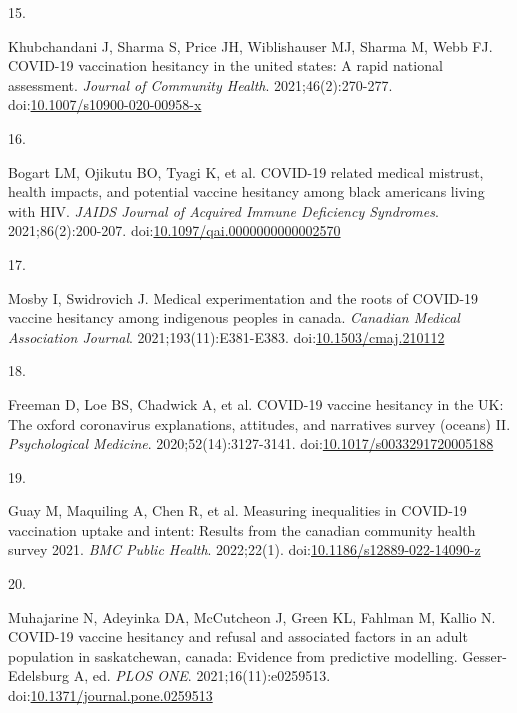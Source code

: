 \documentclass[
  letterpaper,
  DIV=11,
  numbers=noendperiod]{scrartcl}
\newlength{\cslhangindent}
\newlength{\csllabelwidth}
\newlength{\cslentryspacingunit} %
\newenvironment{CSLReferences}[2] %
 {%
  \setlength{\parindent}{0pt}
  \ifodd #1
  \let\oldpar\par
  \def\par{\hangindent=\cslhangindent\oldpar}
  \fi
  \setlength{\parskip}{#2\cslentryspacingunit}
 }%
 {}
\newcommand{\CSLLeftMargin}[1]{\parbox[t]{\csllabelwidth}{#1}}
\newcommand{\CSLRightInline}[1]{\parbox[t]{\linewidth - \csllabelwidth}{#1}\break}
\begin{document}
\begin{CSLReferences}{0}{0}
\leavevmode{}%
\CSLLeftMargin{15. }%
\CSLRightInline{Khubchandani J, Sharma S, Price JH, Wiblishauser MJ,
Sharma M, Webb FJ. {COVID}-19 vaccination hesitancy in the united
states: A rapid national assessment. \emph{Journal of Community Health}.
2021;46(2):270-277.
doi:\href{https://doi.org/10.1007/s10900-020-00958-x}{10.1007/s10900-020-00958-x}}

\leavevmode{}%
\CSLLeftMargin{16. }%
\CSLRightInline{Bogart LM, Ojikutu BO, Tyagi K, et al. {COVID}-19
related medical mistrust, health impacts, and potential vaccine
hesitancy among black americans living with {HIV}. \emph{{JAIDS} Journal
of Acquired Immune Deficiency Syndromes}. 2021;86(2):200-207.
doi:\href{https://doi.org/10.1097/qai.0000000000002570}{10.1097/qai.0000000000002570}}

\leavevmode{}%
\CSLLeftMargin{17. }%
\CSLRightInline{Mosby I, Swidrovich J. Medical experimentation and the
roots of {COVID}-19 vaccine hesitancy among indigenous peoples in
canada. \emph{Canadian Medical Association Journal}.
2021;193(11):E381-E383.
doi:\href{https://doi.org/10.1503/cmaj.210112}{10.1503/cmaj.210112}}

\leavevmode{}%
\CSLLeftMargin{18. }%
\CSLRightInline{Freeman D, Loe BS, Chadwick A, et al. {COVID}-19 vaccine
hesitancy in the {UK}: The oxford coronavirus explanations, attitudes,
and narratives survey (oceans) {II}. \emph{Psychological Medicine}.
2020;52(14):3127-3141.
doi:\href{https://doi.org/10.1017/s0033291720005188}{10.1017/s0033291720005188}}

\leavevmode{}%
\CSLLeftMargin{19. }%
\CSLRightInline{Guay M, Maquiling A, Chen R, et al. Measuring
inequalities in {COVID}-19 vaccination uptake and intent: Results from
the canadian community health survey 2021. \emph{{BMC} Public Health}.
2022;22(1).
doi:\href{https://doi.org/10.1186/s12889-022-14090-z}{10.1186/s12889-022-14090-z}}

\leavevmode{}%
\CSLLeftMargin{20. }%
\CSLRightInline{Muhajarine N, Adeyinka DA, McCutcheon J, Green KL,
Fahlman M, Kallio N. {COVID}-19 vaccine hesitancy and refusal and
associated factors in an adult population in saskatchewan, canada:
Evidence from predictive modelling. Gesser-Edelsburg A, ed. \emph{{PLOS}
{ONE}}. 2021;16(11):e0259513.
doi:\href{https://doi.org/10.1371/journal.pone.0259513}{10.1371/journal.pone.0259513}}


\end{CSLReferences}
\end{document}
